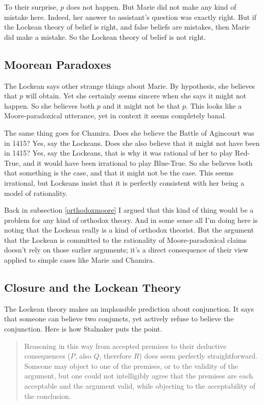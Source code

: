 \documentclass[11pt,]{book}
\begin{document}
To their surprise, \(p\) does not happen. But Marie did not make any kind of mistake here. Indeed, her answer to assistant's question was exactly right. But if the Lockean theory of belief is right, and false beliefs are mistakes, then Marie did make a mistake. So the Lockean theory of belief is not right.

\hypertarget{lockemoore}{%
\subsection{Moorean Paradoxes}\label{lockemoore}}

The Lockean says other strange things about Marie. By hypothesis, she believes that \(p\) will obtain. Yet she certainly seems sincere when she says it might not happen. So she believes both \(p\) and it might not be that \(p\). This looks like a Moore-paradoxical utterance, yet in context it seems completely banal.

The same thing goes for Chamira. Does she believe the Battle of Agincourt was in 1415? Yes, say the Lockeans. Does she also believe that it might not have been in 1415? Yes, say the Lockeans, that is why it was rational of her to play Red-True, and it would have been irrational to play Blue-True. So she believes both that something is the case, and that it might not be the case. This seems irrational, but Lockeans insist that it is perfectly consistent with her being a model of rationality.

Back in subsection \ref{orthodoxmoore} I argued that this kind of thing would be a problem for any kind of orthodox theory. And in some sense all I'm doing here is noting that the Lockean really is a kind of orthodox theorist. But the argument that the Lockean is committed to the rationality of Moore-paradoxical claims doesn't rely on those earlier arguments; it's a direct consequence of their view applied to simple cases like Marie and Chamira.

\hypertarget{closure}{%
\subsection{Closure and the Lockean Theory}\label{closure}}

The Lockean theory makes an implausible prediction about conjunction. It says that someone can believe two conjuncts, yet actively refuse to believe the conjunction. Here is how Stalnaker puts the point.

\begin{quote}
Reasoning in this way from accepted premises to their deductive consequences (\(P\), also \(Q\), therefore \(R\)) does seem perfectly straightforward. Someone may object to one of the premises, or to the validity of the argument, but one could not intelligibly agree that the premises are each acceptable and the argument valid, while objecting to the acceptability of the conclusion. \citep[ 92]{Stalnaker1984}
\end{quote}
\end{document}
